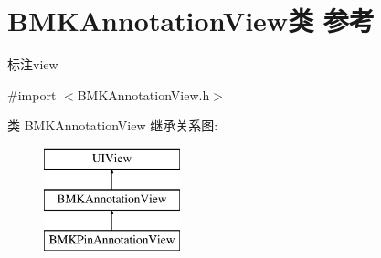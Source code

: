 \hypertarget{interface_b_m_k_annotation_view}{\section{B\+M\+K\+Annotation\+View类 参考}
\label{interface_b_m_k_annotation_view}
}


标注view  




{\ttfamily \#import $<$B\+M\+K\+Annotation\+View.\+h$>$}

类 B\+M\+K\+Annotation\+View 继承关系图\+:\begin{figure}[H]
\begin{center}
\leavevmode
\includegraphics[height=3.000000cm]{interface_b_m_k_annotation_view}
\end{center}
\end{figure}
